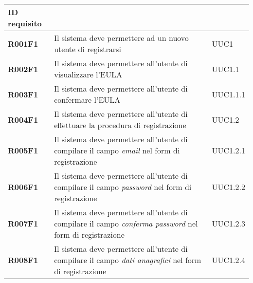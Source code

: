 \documentclass[../analisi-dei-requisiti]{subfiles}
\begin{document}
\centering
{}
\renewcommand{\arraystretch}{2} %
\begin{longtable}[H]{>{\centering\bfseries}m{3cm} >{\centering}m{10cm} >{\centering\arraybackslash}m{3cm}}
  \rowcolor{darkgray!90!}
  \color{white}
  {\textbf{ID requisito}} & \color{white}{\textbf{Descrizione}}                                                                                                            & \color{white}{\textbf{Fonte}} \\
  \endhead
  \rowcolor{white}
  \multicolumn{3}{r}{\textit{Continua alla pagina seguente}}
  \endfoot
  \endlastfoot
  R001F1                  & Il sistema deve permettere ad un nuovo utente di registrarsi                                                                                   & UUC1                          \\
  R002F1                  & Il sistema deve permettere all'utente di visualizzare l'EULA                                                                                   & UUC1.1                        \\
  R003F1                  & Il sistema deve permettere all'utente di confermare l'EULA                                                                                     & UUC1.1.1                      \\
  R004F1                  & Il sistema deve permettere all'utente di effettuare la procedura di registrazione                                                              & UUC1.2                        \\
  R005F1                  & Il sistema deve permettere all'utente di compilare il campo \textit{email} nel form di registrazione                                           & UUC1.2.1                      \\
  R006F1                  & Il sistema deve permettere all'utente di compilare il campo \textit{password} nel form di registrazione                                        & UUC1.2.2                      \\
  R007F1                  & Il sistema deve permettere all'utente di compilare il campo \textit{conferma password} nel form di registrazione                               & UUC1.2.3                      \\
  R008F1                  & Il sistema deve permettere all'utente di compilare il campo \textit{dati anagrafici} nel form di registrazione                                 & UUC1.2.4                      \\

\end{longtable}
\end{document}
